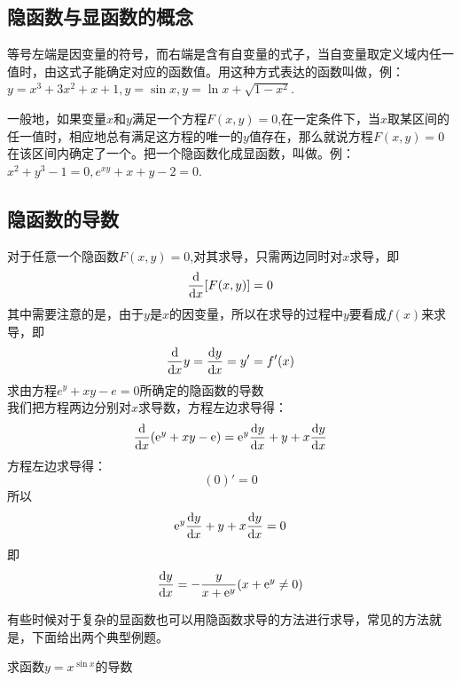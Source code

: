 \subsection{隐函数与显函数的概念}
等号左端是因变量的符号，而右端是含有自变量的式子，当自变量取定义域内任一值时，由这式子能确定对应的函数值。用这种方式表达的函数叫做，例：$y=x^3+3x^2+x+1,y=\sin x,y=\ln x+\sqrt{1-x^2}.$

一般地，如果变量$x$和$y$满足一个方程$F(x,y)=0$,在一定条件下，当$x$取某区间的任一值时，相应地总有满足这方程的唯一的$y$值存在，那么就说方程$F(x,y)=0$在该区间内确定了一个。把一个隐函数化成显函数，叫做。例：$x^2+y^3-1=0,e^{xy}+x+y-2=0.$
\subsection{隐函数的导数}
对于任意一个隐函数$F(x,y)=0$,对其求导，只需两边同时对$x$求导，即
\begin{equation}
	\frac{{\rm{d}}}{{\rm{d}} x}[F(x,y)]=0
\end{equation}
其中需要注意的是，由于$y$是$x$的因变量，所以在求导的过程中$y$要看成$f(x)$来求导，即
\begin{equation}
\frac{{\rm{d}}}{{\rm{d}} x}y=\frac{{\rm{d}} y}{{\rm{d}} x}=y'=f'(x)
\end{equation}
\examples 求由方程$e^y+xy-e=0$所确定的隐函数的导数
\\ \solve 我们把方程两边分别对$x$求导数，方程左边求导得：
\begin{equation}
	\nonumber
\frac{{\rm{d}}}{{\rm{d}} x}({\rm{e}}^y+xy-{\rm{e}})={\rm{e}}^y\frac{{\rm{d}} y}{{\rm{d}} x}+y+x\frac{{\rm{d}} y}{{\rm{d}} x}
\end{equation}
方程左边求导得：
\begin{equation}
	\nonumber
(0)'=0
\end{equation}
所以
\begin{equation}
	\nonumber
	{\rm{e}}^y\frac{{\rm{d}} y}{{\rm{d}} x}+y+x\frac{{\rm{d}} y}{{\rm{d}} x}=0
\end{equation}
即\begin{equation}
	\frac{{\rm{d}} y}{{\rm{d}} x}=-\frac{y}{x+{\rm{e}}^y}(x+{\rm{e}}^y\neq0)
\end{equation}

有些时候对于复杂的显函数也可以用隐函数求导的方法进行求导，常见的方法就是，下面给出两个典型例题。
\clearpage
\vspace*{-2.5em}

\examples 求函数$y=x^{\textstyle \sin x}$的导数


